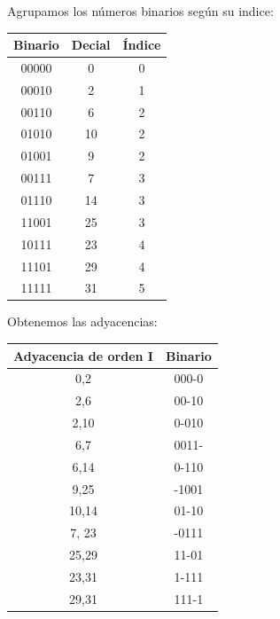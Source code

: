 \documentclass[a4paper,12pt]{article}
\begin{document}
\begin{enumerate}[label=\textcolor{teal}{\textbf{\arabic*.}}]
\begin{center}
\begin{tabular}{|c|c|c|c|}
            \end{tabular}
        \end{center}
        Agrupamos los números binarios según su indice:\\
        \begin{center}
            \begin{tabular}{|c|c|c|}
                \hline
                Binario & Decial & Índice\\ \hline
                00000 & 0 & 0 \\ \hline
                00010 & 2 & 1 \\ \hline  
                00110 & 6 & 2 \\ \hline 
                01010 & 10 & 2 \\ \hline
                01001 & 9 & 2 \\ \hline  
                00111 & 7 & 3 \\ \hline  
                01110 & 14 & 3 \\ \hline  
                11001 & 25 & 3 \\ \hline    
                10111 & 23 & 4 \\ \hline  
                11101 & 29 & 4 \\ \hline  
                11111 & 31 & 5 \\ \hline  
            \end{tabular}
        \end{center}
        Obtenemos las adyacencias: \\

        \begin{center}
            \begin{tabular}{|c|c|}
                \hline
                Adyacencia de orden I & Binario\\ \hline
                0,2 & 000-0 \\ \hline 
                2,6 & 00-10 \\ \hline 
                2,10 & 0-010 \\ \hline
                6,7 & 0011- \\ \hline
                6,14 & 0-110 \\ \hline
                9,25 & -1001 \\ \hline 
                10,14 & 01-10 \\ \hline
                7, 23 & -0111 \\ \hline 
                25,29 & 11-01 \\ \hline 
                23,31 & 1-111 \\ \hline 
                29,31 & 111-1 \\ \hline 
            \end{tabular}
        \end{center}


\end{enumerate}
\end{document}

